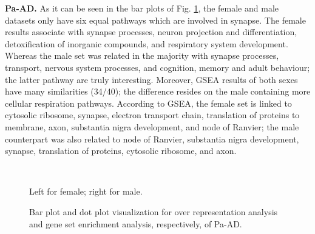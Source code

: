 \textbf{Pa-AD.} As it can be seen in the bar plots of Fig. \ref{fig:path-pa-ad}, the female and male datasets only have six equal pathways which are involved in synapse. The female results associate with synapse processes, neuron projection and differentiation, detoxification of inorganic compounds, and respiratory system development. Whereas the male set was related in the majority with synapse processes, transport, nervous system processes, and cognition, memory and adult behaviour; the latter pathway are truly interesting. Moreover, GSEA results of both sexes have many similarities (34/40); the difference resides on the male containing more cellular respiration pathways. According to GSEA, the female set is linked to cytosolic ribosome, synapse, electron transport chain, translation of proteins to membrane, axon, substantia nigra development, and node of Ranvier; the male counterpart was also related to node of Ranvier, substantia nigra development, synapse, translation of proteins, cytosolic ribosome, and axon.

\begin{figure}[!ht]%
    \centering
    \qquad
    \\
    \qquad
\caption{Bar plot and dot plot visualization for over representation analysis and gene set enrichment analysis, respectively, of Pa-AD.}
\footnotesize Left for female; right for male.
\label{fig:path-pa-ad}%
\end{figure}

